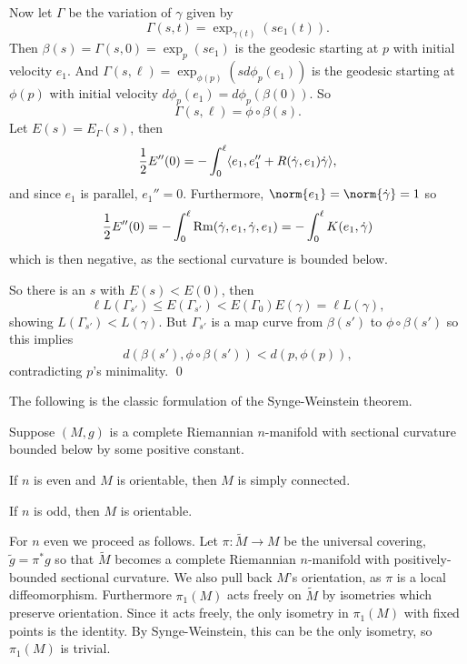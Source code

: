     Now let $\Gamma$ be the variation of $\gamma$ given by
    $$ \Gamma(s,t) = \exp_{\gamma(t)}(se_1(t)) . $$
    Then $\beta(s)=\Gamma(s,0)=\exp_p(se_1)$ is the geodesic starting at $p$ with initial velocity $e_1$.
    And $\Gamma(s,\ell)=\exp_{\phi(p)}(sd\phi_p(e_1))$ is the geodesic starting at $\phi(p)$ with initial velocity
    $d\phi_p(e_1)=d\phi_p(\beta(0))$.
    So
    $$ \Gamma(s,\ell) = \phi\circ\beta(s) . $$
    Let $E(s)=E_\Gamma(s)$, then
    $$ {{1}\over{2}}E''(0) = -\int_0^\ell\mathopen{}\mathclose{\left<e_1,e_1''+R(\dot\gamma,e_1)\dot\gamma\right>} , $$
    and since $e_1$ is parallel, $e_1''=0$.
    Furthermore, $\norm{e_1}=\norm{\dot\gamma}=1$ so
    $$ {{1}\over{2}}E''(0) = -\int_0^\ell{\rm Rm}(\dot\gamma,e_1,\dot\gamma,e_1) = -\int_0^\ell K(e_1,\dot\gamma) $$
    which is then negative, as the sectional curvature is bounded below.

    So there is an $s$ with $E(s)<E(0)$, then
    $$ \ell L(\Gamma_{s'}) \leq E(\Gamma_{s'}) < E(\Gamma_0) E(\gamma) = \ell L(\gamma) , $$
    showing $L(\Gamma_{s'})<L(\gamma)$.
    But $\Gamma_{s'}$ is a map curve from $\beta(s')$ to $\phi\circ\beta(s')$ so this implies
    $$ d(\beta(s'),\phi\circ\beta(s')) < d(p,\phi(p)) , $$
    contradicting $p$'s minimality.
    \qed

\eproof

The following is the classic formulation of the Synge-Weinstein theorem.

\bcoro

    Suppose $(M,g)$ is a complete Riemannian $n$-manifold with sectional curvature bounded below by some positive constant.
    \benum
        \item If $n$ is even and $M$ is orientable, then $M$ is simply connected.
        \item If $n$ is odd, then $M$ is orientable.
    \eenum

\ecoro

\bproof

    For $n$ even we proceed as follows.
    Let $\pi\colon\tilde M\to M$ be the universal covering, $\tilde g=\pi^*g$ so that $\tilde M$ becomes a complete
    Riemannian $n$-manifold with positively-bounded sectional curvature.
    We also pull back $M$'s orientation, as $\pi$ is a local diffeomorphism.
    Furthermore $\pi_1(M)$ acts freely on $\tilde M$ by isometries which preserve orientation.
    Since it acts freely, the only isometry in $\pi_1(M)$ with fixed points is the identity.
    By Synge-Weinstein, this can be the only isometry, so $\pi_1(M)$ is trivial.

